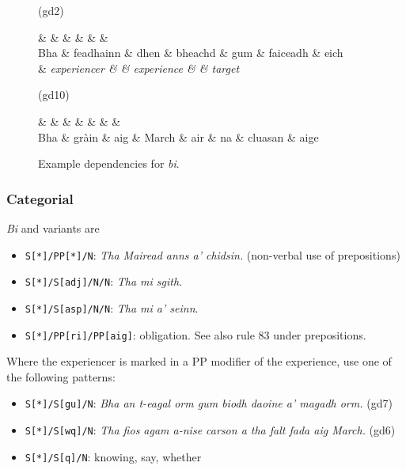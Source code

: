 \documentclass[a4paper]{article}
\begin{document}
\begin{figure}
\begin{center}
(gd2)
\begin{dependency}
\begin{deptext}
\ROOT \& \nsubj \& \adpmod \& \adpobj \& \marker \& \ccomp \& \dobj\\
Bha \& feadhainn \& dhen \& bheachd \& gum \& faiceadh \& eich\\
    \& \it experiencer \& \& \it experience \& \& \it target \\
\end{deptext}
\end{dependency}

(gd10)
\begin{dependency}
\begin{deptext}
\ROOT \& \nsubj \& \adpmod \& \adpobj \& \adpmod \& \deter \& \adpobj \& \adpmod \\
Bha \& gr\`ain  \& aig \& March \& air \& na \& cluasan \& aige \\
\end{deptext}
\end{dependency}
\end{center}
\caption{Example dependencies for \textit{bi}.\label{fig:biexamples}}
\end{figure}

\subsubsection*{Categorial}

 \textit{Bi} and variants are \begin{itemize}
\item \texttt{S[*]/PP[*]/N}: \textit{Tha Mairead anns a' chidsin.} (non-verbal use of prepositions)
\item \texttt{S[*]/S[adj]/N/N}: \textit{Tha mi sgith}.
\item \texttt{S[*]/S[asp]/N/N}: \textit{Tha mi a' seinn}.
\item \texttt{S[*]/PP[ri]/PP[aig]}: obligation. See also rule 83 under prepositions.
\end{itemize}

Where the experiencer is marked in a PP modifier of the experience, use one of the following patterns:
\begin{itemize}
\item \texttt{S[*]/S[gu]/N}: \textit{Bha an t-eagal orm gum biodh daoine a' magadh orm.} (gd7)
\item \texttt{S[*]/S[wq]/N}: \textit{Tha fios agam a-nise carson a tha falt fada aig March.} (gd6)
\item \texttt{S[*]/S[q]/N}: knowing, say, whether
\end{itemize}
\end{document}
